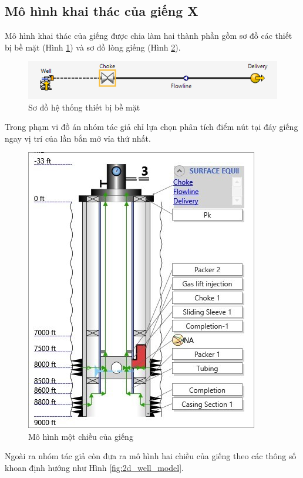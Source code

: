 \documentclass[12pt,a4paper]{report}
\begin{document}
\vspace{15pt}
\subsection{Mô hình khai thác của giếng X}

Mô hình khai thác của giếng được chia làm hai thành phần gồm sơ đồ các thiết bị bề mặt (Hình \ref{fig:surface_equipment}) và sơ đồ lòng giếng (Hình \ref{fig:1d_well_model}).
	\begin{figure}[h]
		\centering
		\includegraphics[scale=.9]{Fig/surface_equipment.PNG}
		\caption{Sơ đồ hệ thống thiết bị bề mặt}
		\label{fig:surface_equipment}
	\end{figure}
\newline
Trong phạm vi đồ án nhóm tác giả chỉ lựa chọn phân tích điểm nút tại đáy giếng ngay vị trí của lần bắn mở vỉa thứ nhất.
\newpage
	\begin{figure}[h]
		\centering
		\includegraphics[scale=1.1]{Fig/1d_well_model.png}
		\caption{Mô hình một chiều của giếng}
		\label{fig:1d_well_model}
	\end{figure}
Ngoài ra nhóm tác giả còn đưa ra mô hình hai chiều của giếng theo các thông số khoan định hướng như Hình \ref{fig:2d_well_model}.
\end{document}
